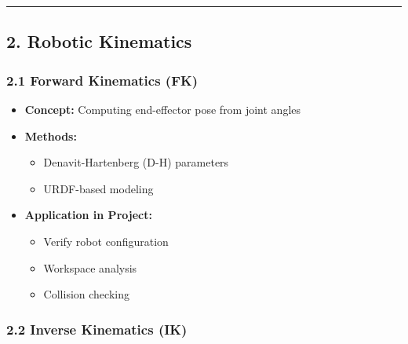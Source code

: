 \documentclass[
]{article}
\providecommand{\tightlist}{%
  \setlength{\itemsep}{0pt}\setlength{\parskip}{0pt}}
\begin{document}
\begin{center}\rule{0.5\linewidth}{0.5pt}\end{center}

\hypertarget{robotic-kinematics}{%
\subsection{2. Robotic Kinematics}\label{robotic-kinematics}}

\hypertarget{forward-kinematics-fk}{%
\subsubsection{2.1 Forward Kinematics
(FK)}\label{forward-kinematics-fk}}

\begin{itemize}
\tightlist
\item
  \textbf{Concept:} Computing end-effector pose from joint angles
\item
  \textbf{Methods:}

  \begin{itemize}
  \tightlist
  \item
    Denavit-Hartenberg (D-H) parameters
  \item
    URDF-based modeling
  \end{itemize}
\item
  \textbf{Application in Project:}

  \begin{itemize}
  \tightlist
  \item
    Verify robot configuration
  \item
    Workspace analysis
  \item
    Collision checking
  \end{itemize}
\end{itemize}

\hypertarget{inverse-kinematics-ik}{%
\subsubsection{2.2 Inverse Kinematics
(IK)}\label{inverse-kinematics-ik}}
\end{document}
